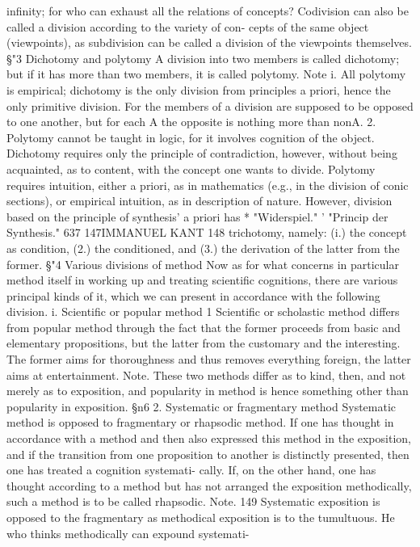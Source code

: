 {infinity; for who can exhaust all the relations of concepts?
Codivision can also be called a division according to the variety of con-
cepts of the same object (viewpoints), as subdivision can be called a
division of the viewpoints themselves.
§"3
Dichotomy and polytomy
A division into two members is called dichotomy; but if it has more than two
members, it is called polytomy.
Note i. All polytomy is empirical; dichotomy is the only division from principles a
priori, hence the only primitive division. For the members of a division are
supposed to be opposed to one another, but for each A the opposite is
nothing more than nonA.
2. Polytomy cannot be taught in logic, for it involves cognition of the object.
Dichotomy requires only the principle of contradiction, however, without
being acquainted, as to content, with the concept one wants to divide.
Polytomy requires intuition, either a priori, as in mathematics (e.g., in the
division of conic sections), or empirical intuition, as in description of
nature. However, division based on the principle of synthesis' a priori has
* "Widerspiel."
' "Princip der Synthesis."
637
147IMMANUEL KANT
148
trichotomy, namely: (i.) the concept as condition, (2.) the conditioned,
and (3.) the derivation of the latter from the former.
§"4
Various divisions of method
Now as for what concerns in particular method itself in working up and
treating scientific cognitions, there are various principal kinds of it, which
we can present in accordance with the following division.
i. Scientific or popular method
1
Scientific or scholastic method differs from popular method through the
fact that the former proceeds from basic and elementary propositions,
but the latter from the customary and the interesting. The former aims
for thoroughness and thus removes everything foreign, the latter aims at
entertainment.
Note.
These two methods differ as to kind, then, and not merely as to exposition,
and popularity in method is hence something other than popularity in
exposition.
§n6
2. Systematic or fragmentary
method
Systematic method is opposed to fragmentary or rhapsodic method. If one
has thought in accordance with a method and then also expressed this
method in the exposition, and if the transition from one proposition to
another is distinctly presented, then one has treated a cognition systemati-
cally. If, on the other hand, one has thought according to a method but has
not arranged the exposition methodically, such a method is to be called
rhapsodic.
Note.
149
Systematic exposition is opposed to the fragmentary as methodical exposition
is to the tumultuous. He who thinks methodically can expound systemati-
}
